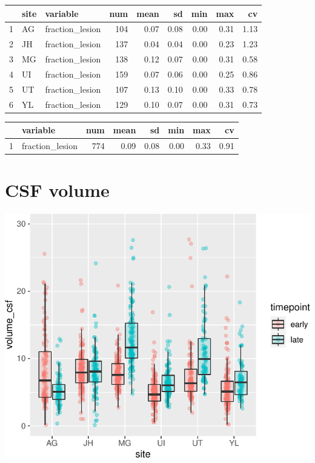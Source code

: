 \documentclass[
]{article}
\begin{document}
\begin{table}[ht]
\centering
\begin{tabular}{rllrrrrrr}
  \hline
 & site & variable & num & mean & sd & min & max & cv \\ 
  \hline
1 & AG & fraction\_lesion & 104 & 0.07 & 0.08 & 0.00 & 0.31 & 1.13 \\ 
  2 & JH & fraction\_lesion & 137 & 0.04 & 0.04 & 0.00 & 0.23 & 1.23 \\ 
  3 & MG & fraction\_lesion & 138 & 0.12 & 0.07 & 0.00 & 0.31 & 0.58 \\ 
  4 & UI & fraction\_lesion & 159 & 0.07 & 0.06 & 0.00 & 0.25 & 0.86 \\ 
  5 & UT & fraction\_lesion & 107 & 0.13 & 0.10 & 0.00 & 0.33 & 0.78 \\ 
  6 & YL & fraction\_lesion & 129 & 0.10 & 0.07 & 0.00 & 0.31 & 0.73 \\ 
   \hline
\end{tabular}
\end{table}
\begin{table}[ht]
\centering
\begin{tabular}{rlrrrrrr}
  \hline
 & variable & num & mean & sd & min & max & cv \\ 
  \hline
1 & fraction\_lesion & 774 & 0.09 & 0.08 & 0.00 & 0.33 & 0.91 \\ 
   \hline
\end{tabular}
\end{table}

\hypertarget{csf-volume}{%
\section{CSF volume}\label{csf-volume}}

\begin{center}\includegraphics{paper_files/figure-latex/plot_csf_both-1} \end{center}
\end{document}

